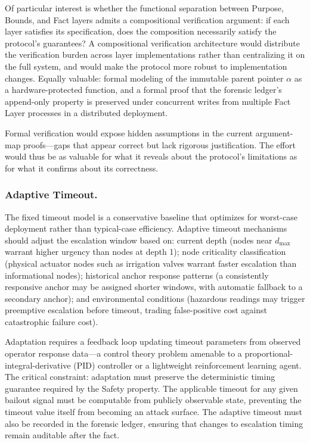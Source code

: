 Of particular interest is whether the functional separation between Purpose, Bounds, and Fact layers admits a compositional verification argument: if each layer satisfies its specification, does the composition necessarily satisfy the protocol's guarantees? A compositional verification architecture would distribute the verification burden across layer implementations rather than centralizing it on the full system, and would make the protocol more robust to implementation changes. Equally valuable: formal modeling of the immutable parent pointer $\alpha$ as a hardware-protected function, and a formal proof that the forensic ledger's append-only property is preserved under concurrent writes from multiple Fact Layer processes in a distributed deployment.

Formal verification would expose hidden assumptions in the current argument-map proofs---gaps that appear correct but lack rigorous justification. The effort would thus be as valuable for what it reveals about the protocol's limitations as for what it confirms about its correctness.

\subsubsection{Adaptive Timeout.}
\label{sec:future-adaptive-timeout}

The fixed timeout model is a conservative baseline that optimizes for worst-case deployment rather than typical-case efficiency. Adaptive timeout mechanisms should adjust the escalation window based on: current depth (nodes near $d_{\max}$ warrant higher urgency than nodes at depth 1); node criticality classification (physical actuator nodes such as irrigation valves warrant faster escalation than informational nodes); historical anchor response patterns (a consistently responsive anchor may be assigned shorter windows, with automatic fallback to a secondary anchor); and environmental conditions (hazardous readings may trigger preemptive escalation before timeout, trading false-positive cost against catastrophic failure cost).

Adaptation requires a feedback loop updating timeout parameters from observed operator response data---a control theory problem amenable to a proportional-integral-derivative (PID) controller or a lightweight reinforcement learning agent. The critical constraint: adaptation must preserve the deterministic timing guarantee required by the Safety property. The applicable timeout for any given bailout signal must be computable from publicly observable state, preventing the timeout value itself from becoming an attack surface. The adaptive timeout must also be recorded in the forensic ledger, ensuring that changes to escalation timing remain auditable after the fact.


